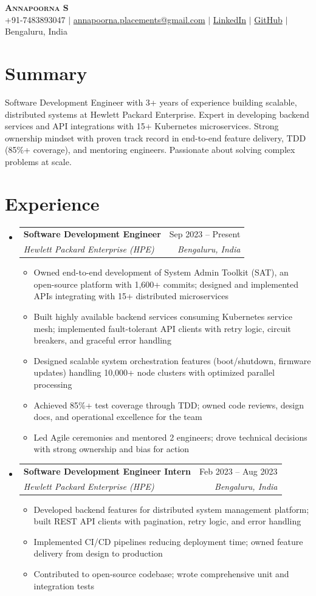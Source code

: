\documentclass[letterpaper,10.5pt]{article}
\makeatletter
\newcommand{\resumeItem}[1]{\item\small{#1 \vspace{-3pt}}}
\newcommand{\resumeSubheading}[4]{
  \vspace{-3pt}\item
    \begin{tabular*}{0.97\textwidth}[t]{l@{\extracolsep{\fill}}r}
      \textbf{#1} & #2 \\
      \textit{\small#3} & \textit{\small #4} \\
    \end{tabular*}\vspace{-8pt}
}
\newcommand{\resumeSubHeadingListStart}{\begin{itemize}[leftmargin=0.15in, label={}]}
\newcommand{\resumeSubHeadingListEnd}{\end{itemize}}
\newcommand{\resumeItemListStart}{\begin{itemize}[leftmargin=0.15in]}
\newcommand{\resumeItemListEnd}{\end{itemize}\vspace{-6pt}}
\makeatother
\begin{document}
\begin{center}
    \textbf{\Huge \scshape Annapoorna S} \\ \vspace{2pt}
    \small +91-7483893047 $|$ \href{mailto:annapoorna.placements@gmail.com}{annapoorna.placements@gmail.com} $|$
    \href{https://www.linkedin.com/in/annapoorna-s-a18b371a5/}{LinkedIn} $|$
    \href{https://github.com/annapoorna-mygit}{GitHub} $|$
    Bengaluru, India
\end{center}

\section{Summary}
\small{Software Development Engineer with 3+ years of experience building scalable, distributed systems at Hewlett Packard Enterprise. Expert in developing backend services and API integrations with 15+ Kubernetes microservices. Strong ownership mindset with proven track record in end-to-end feature delivery, TDD (85\%+ coverage), and mentoring engineers. Passionate about solving complex problems at scale.}

\section{Experience}
  \resumeSubHeadingListStart
    \resumeSubheading
      {Software Development Engineer}{Sep 2023 -- Present}
      {Hewlett Packard Enterprise (HPE)}{Bengaluru, India}
      \resumeItemListStart
        \resumeItem{Owned end-to-end development of System Admin Toolkit (SAT), an open-source platform with 1,600+ commits; designed and implemented APIs integrating with 15+ distributed microservices}
        \resumeItem{Built highly available backend services consuming Kubernetes service mesh; implemented fault-tolerant API clients with retry logic, circuit breakers, and graceful error handling}
        \resumeItem{Designed scalable system orchestration features (boot/shutdown, firmware updates) handling 10,000+ node clusters with optimized parallel processing}
        \resumeItem{Achieved 85\%+ test coverage through TDD; owned code reviews, design docs, and operational excellence for the team}
        \resumeItem{Led Agile ceremonies and mentored 2 engineers; drove technical decisions with strong ownership and bias for action}
      \resumeItemListEnd

    \resumeSubheading
      {Software Development Engineer Intern}{Feb 2023 -- Aug 2023}
      {Hewlett Packard Enterprise (HPE)}{Bengaluru, India}
      \resumeItemListStart
        \resumeItem{Developed backend features for distributed system management platform; built REST API clients with pagination, retry logic, and error handling}
        \resumeItem{Implemented CI/CD pipelines reducing deployment time; owned feature delivery from design to production}
        \resumeItem{Contributed to open-source codebase; wrote comprehensive unit and integration tests}
      \resumeItemListEnd
  \resumeSubHeadingListEnd
\end{document}
